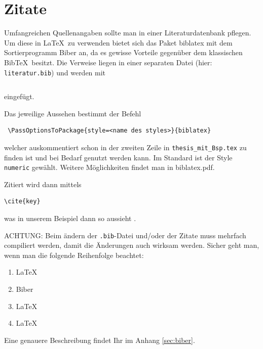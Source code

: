 \documentclass[12pt,DIV=15,BCOR=15mm,twoside,headsepline,abstract=true,listof=totoc,bibliography=totoc]{scrreprt}
\theoremstyle{remark}    %
\begin{document}
    \section{Zitate}
    \label{ch:bib}
    Umfangreichen Quellenangaben sollte man in einer Literaturdatenbank pflegen. Um diese in \LaTeX\ zu verwenden bietet sich das Paket biblatex mit dem Sortierprogramm
    Biber an, da es gewisse Vorteile gegenüber dem klassischen Bib\TeX\ besitzt.
    Die Verweise liegen in einer separaten Datei (hier: \texttt{literatur.bib}) und werden mit \begin{verbatim}
    \end{verbatim} eingefügt.

    Das jeweilige Aussehen bestimmt der Befehl \begin{verbatim} \PassOptionsToPackage{style=<name des styles>}{biblatex}
    \end{verbatim} welcher auskommentiert schon in der zweiten Zeile in \verb/thesis_mit_Bsp.tex/ zu finden ist und bei Bedarf genutzt werden kann.
    Im Standard ist der Style \verb/numeric/ gewählt. Weitere Möglichkeiten findet man in biblatex.pdf.

    Zitiert wird dann mittels \begin{verbatim}\cite{key}
    \end{verbatim} was in unserem Beispiel dann so aussieht \cite{forster1983analysis}.

    \noindent ACHTUNG: Beim ändern der {\texttt{.bib}}-Datei und/oder der Zitate muss mehrfach compiliert werden, damit die Änderungen auch wirksam werden. Sicher geht man, wenn man die folgende Reihenfolge beachtet:
    \begin{enumerate}
        \item \LaTeX
        \item Biber
        \item \LaTeX
        \item \LaTeX
    \end{enumerate}

    Eine genauere Beschreibung findet Ihr im Anhang \ref{sec:biber}.
    \appendix

    \printbibliography %


    \eigenstaenigkeitserklaerung
\end{document}
